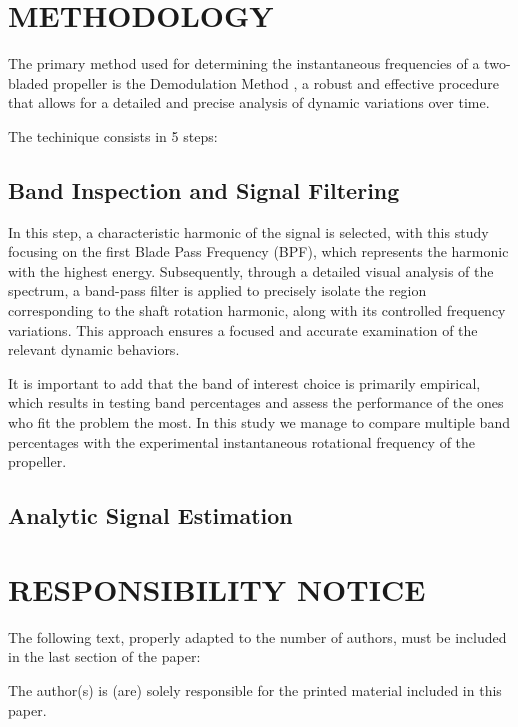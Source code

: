 \documentclass[10pt,fleqn,a4paper,twoside]{article}
\begin{document}
\section{METHODOLOGY}
The primary method used for determining the instantaneous frequencies of a two-bladed propeller is the Demodulation Method \citep{BONNARDOT2005766}, a robust and effective procedure that allows for a detailed and precise analysis of dynamic variations over time.

The techinique consists in 5 steps:

\subsection{Band Inspection and Signal Filtering}

In this step, a characteristic harmonic of the signal is selected, with this study focusing on the first Blade Pass Frequency (BPF), which represents the harmonic with the highest energy. Subsequently, through a detailed visual analysis of the spectrum, a band-pass filter is applied to precisely isolate the region corresponding to the shaft rotation harmonic, along with its controlled frequency variations. This approach ensures a focused and accurate examination of the relevant dynamic behaviors.

It is important to add that the band of interest choice is primarily empirical, which results in testing band percentages and assess the performance of the ones who fit the problem the most. In this study we manage to compare multiple band percentages with the experimental instantaneous rotational frequency of the propeller.

\subsection{Analytic Signal Estimation}



\renewcommand{\refname}{}


\section{RESPONSIBILITY NOTICE}

The following text, properly adapted to the number of authors, must be included in the last section of the paper:

The author(s) is (are) solely responsible for the printed material included in this paper.
\end{document}
